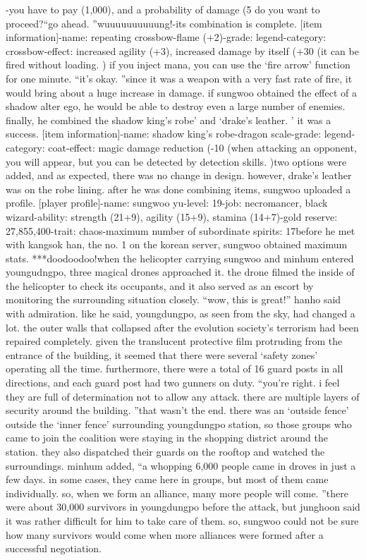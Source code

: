 -you have to pay (1,000), and a probability of damage (5%
 do you want to proceed?“go ahead.
”wuuuuuuuuuung!-its combination is complete.
[item information]-name: repeating crossbow-flame (+2)-grade: legend-category: crossbow-effect: increased agility (+3), increased damage by itself (+30%
 (it can be fired without loading.
) if you inject mana, you can use the ‘fire arrow’ function for one minute.
“it’s okay.
”since it was a weapon with a very fast rate of fire, it would bring about a huge increase in damage.
 if sungwoo obtained the effect of a shadow alter ego, he would be able to destroy even a large number of enemies.
finally, he combined the shadow king’s robe’ and ‘drake’s leather.
’ it was a success.
[item information]-name: shadow king’s robe-dragon scale-grade: legend-category: coat-effect: magic damage reduction (-10%
 (when attacking an opponent, you will appear, but you can be detected by detection skills.
)two options were added, and as expected, there was no change in design.
 however, drake’s leather was on the robe lining.
after he was done combining items, sungwoo uploaded a profile.
[player profile]-name: sungwoo yu-level: 19-job: necromancer, black wizard-ability: strength (21+9), agility (15+9), stamina (14+7)-gold reserve: 27,855,400-trait: chaos-maximum number of subordinate spirits: 17before he met with kangsok han, the no.
 1 on the korean server, sungwoo obtained maximum stats.
***doodoodoo!when the helicopter carrying sungwoo and minhum entered youngudngpo, three magical drones approached it.
 the drone filmed the inside of the helicopter to check its occupants, and it also served as an escort by monitoring the surrounding situation closely.
“wow, this is great!” hanho said with admiration.
like he said, youngdungpo, as seen from the sky, had changed a lot.
 the outer walls that collapsed after the evolution society’s terrorism had been repaired completely.
 given the translucent protective film protruding from the entrance of the building, it seemed that there were several ‘safety zones’ operating all the time.
furthermore, there were a total of 16 guard posts in all directions, and each guard post had two gunners on duty.
“you’re right.
 i feel they are full of determination not to allow any attack.
 there are multiple layers of security around the building.
”that wasn’t the end.
 there was an ‘outside fence’ outside the ‘inner fence’ surrounding youngdungpo station, so those groups who came to join the coalition were staying in the shopping district around the station.
 they also dispatched their guards on the rooftop and watched the surroundings.
minhum added, “a whopping 6,000 people came in droves in just a few days.
 in some cases, they came here in groups, but most of them came individually.
 so, when we form an alliance, many more people will come.
”there were about 30,000 survivors in youngdungpo before the attack, but junghoon said it was rather difficult for him to take care of them.
so, sungwoo could not be sure how many survivors would come when more alliances were formed after a successful negotiation.


